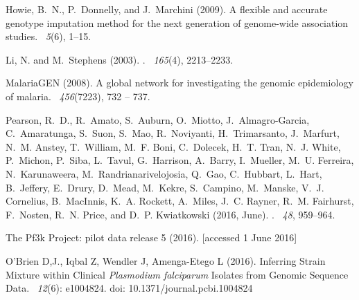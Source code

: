 \documentclass{bioinfo}
\begin{document}
\begin{thebibliography}{}
Howie, B.~N., P.~Donnelly, and J.~Marchini (2009).
\newblock A flexible and accurate genotype imputation method for the next
  generation of genome-wide association studies.
~{\em 5\/}(6), 1--15.

Li, N. and M.~Stephens (2003).
.
~{\em 165\/}(4), 2213--2233.

MalariaGEN (2008).
\newblock A global network for investigating the genomic epidemiology of
  malaria.
~{\em 456\/}(7223), 732 -- 737.

Pearson, R.~D., R.~Amato, S.~Auburn, O.~Miotto, J.~Almagro-Garcia,
  C.~Amaratunga, S.~Suon, S.~Mao, R.~Noviyanti, H.~Trimarsanto, J.~Marfurt,
  N.~M. Anstey, T.~William, M.~F. Boni, C.~Dolecek, H.~T. Tran, N.~J. White,
  P.~Michon, P.~Siba, L.~Tavul, G.~Harrison, A.~Barry, I.~Mueller, M.~U.
  Ferreira, N.~Karunaweera, M.~Randrianarivelojosia, Q.~Gao, C.~Hubbart,
  L.~Hart, B.~Jeffery, E.~Drury, D.~Mead, M.~Kekre, S.~Campino, M.~Manske,
  V.~J. Cornelius, B.~MacInnis, K.~A. Rockett, A.~Miles, J.~C. Rayner, R.~M.
  Fairhurst, F.~Nosten, R.~N. Price, and D.~P. Kwiatkowski (2016, June).
.
~{\em 48}, 959--964.

The Pf3k Project: pilot data release 5 (2016).
 [accessed 1 June 2016]

O'Brien D,J., Iqbal Z, Wendler J, Amenga-Etego L (2016). \newblock Inferring Strain Mixture within Clinical {\em Plasmodium falciparum} Isolates from Genomic Sequence Data. ~{\em 12\/}(6): e1004824. doi: 10.1371/journal.pcbi.1004824



\end{thebibliography}
\end{document}
